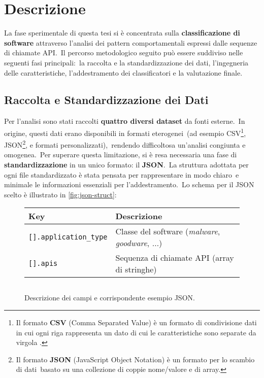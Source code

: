 \section{Descrizione}

La fase sperimentale di questa tesi si è concentrata sulla \textbf{classificazione di software} attraverso
l'analisi dei pattern comportamentali espressi dalle sequenze di chiamate API.\
Il percorso metodologico seguito può essere suddiviso nelle seguenti fasi principali:\
la raccolta e la standardizzazione dei dati, l'ingegneria delle caratteristiche, l'addestramento dei classificatori
e la valutazione finale.

\subsection{Raccolta e Standardizzazione dei Dati}

Per l'analisi sono stati raccolti \textbf{quattro diversi dataset} da fonti esterne.\
In origine, questi dati erano disponibili in formati eterogenei\
(ad esempio CSV\footnote{Il formato \textbf{CSV} (Comma Separated Value) è un formato di condivisione dati in cui ogni
    riga rappresenta un dato di cui le caratteristiche sono separate da virgola .},
JSON\footnote{Il formato \textbf{JSON} (JavaScript Object Notation) è un formato per lo scambio di dati\
    basato su una collezione di coppie nome/valore e di array.}, e formati personalizzati),\
rendendo difficoltosa un'analisi congiunta e omogenea.\
Per superare questa limitazione, si è resa necessaria una fase di \textbf{standardizzazione} in un unico formato:
il \textbf{JSON}.\
La struttura adottata per ogni file standardizzato è stata pensata per rappresentare in modo chiaro\
e minimale le informazioni essenziali per l'addestramento.\
Lo schema per il JSON scelto è illustrato in \autoref{fig:json-struct}:

\begin{figure}[h!]
    \centering
    \renewcommand{\arraystretch}{1.3}
    \begin{tabular}{p{0.25\textwidth} p{0.65\textwidth}}
        \toprule
        \textbf{Key}                  & \textbf{Descrizione}                                           \\
        \midrule
        \texttt{[].application\_type} & Classe del software (\emph{malware}, \emph{goodware}, $\dots$) \\
        \texttt{[].apis}              & Sequenza di chiamate API (array di stringhe)                   \\
        \bottomrule
    \end{tabular}

    \vspace{4mm} %

    \inputminted[fontsize=\small]{json}{approccio-proposto/example.json}
    \caption{Descrizione dei campi e corrispondente esempio JSON.}
    \label{fig:json-struct}
\end{figure}

